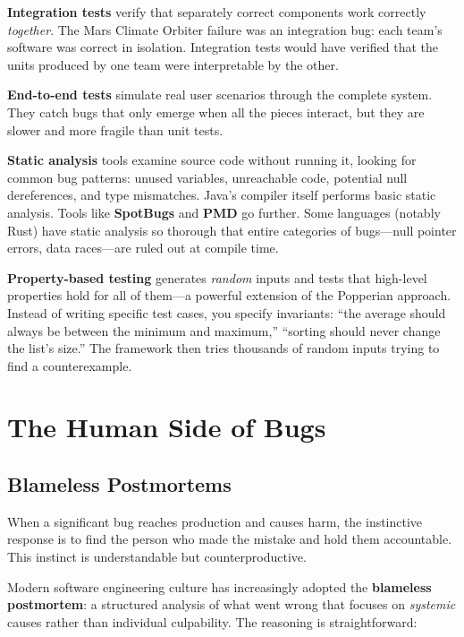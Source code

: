 \documentclass[11pt,letterpaper]{article}
\newcommand{\keyterm}[1]{\textbf{\textcolor{cssecondary}{#1}}}
\begin{document}
\textbf{Integration tests} verify that separately correct components work correctly \textit{together}. The Mars Climate Orbiter failure was an integration bug: each team's software was correct in isolation. Integration tests would have verified that the units produced by one team were interpretable by the other.

\textbf{End-to-end tests} simulate real user scenarios through the complete system. They catch bugs that only emerge when all the pieces interact, but they are slower and more fragile than unit tests.

\textbf{Static analysis} tools examine source code without running it, looking for common bug patterns: unused variables, unreachable code, potential null dereferences, and type mismatches. Java's compiler itself performs basic static analysis. Tools like \textbf{SpotBugs} and \textbf{PMD} go further. Some languages (notably Rust) have static analysis so thorough that entire categories of bugs---null pointer errors, data races---are ruled out at compile time.

\textbf{Property-based testing} generates \textit{random} inputs and tests that high-level properties hold for all of them---a powerful extension of the Popperian approach. Instead of writing specific test cases, you specify invariants: ``the average should always be between the minimum and maximum,'' ``sorting should never change the list's size.'' The framework then tries thousands of random inputs trying to find a counterexample.

\section{The Human Side of Bugs}

\subsection{Blameless Postmortems}

When a significant bug reaches production and causes harm, the instinctive response is to find the person who made the mistake and hold them accountable. This instinct is understandable but counterproductive.

Modern software engineering culture has increasingly adopted the \keyterm{blameless postmortem}: a structured analysis of what went wrong that focuses on \textit{systemic} causes rather than individual culpability. The reasoning is straightforward:
\end{document}
